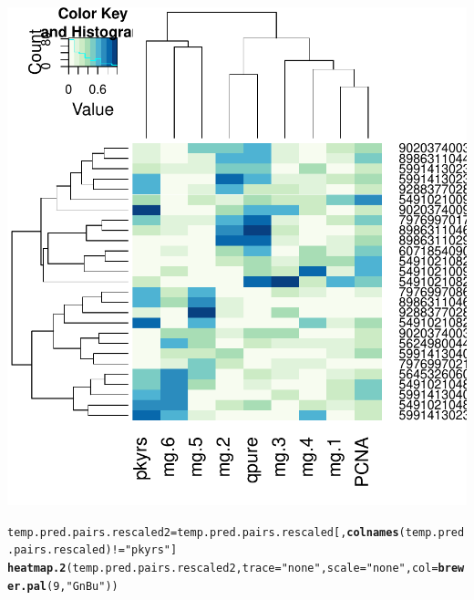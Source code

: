 \documentclass{article}\usepackage[]{graphicx}\usepackage[]{color}
\makeatletter
\def\maxwidth{ %
  \ifdim\Gin@nat@width>\linewidth
    \linewidth
  \else
    \Gin@nat@width
  \fi
}
\newcommand{\hlnum}[1]{\textcolor[rgb]{0.686,0.059,0.569}{#1}}%
\newcommand{\hlstr}[1]{\textcolor[rgb]{0.192,0.494,0.8}{#1}}%
\newcommand{\hlopt}[1]{\textcolor[rgb]{0,0,0}{#1}}%
\newcommand{\hlstd}[1]{\textcolor[rgb]{0.345,0.345,0.345}{#1}}%
\newcommand{\hlkwb}[1]{\textcolor[rgb]{0.69,0.353,0.396}{#1}}%
\newcommand{\hlkwc}[1]{\textcolor[rgb]{0.333,0.667,0.333}{#1}}%
\newcommand{\hlkwd}[1]{\textcolor[rgb]{0.737,0.353,0.396}{\textbf{#1}}}%
\newenvironment{kframe}{%
 \def\at@end@of@kframe{}%
 \ifinner\ifhmode%
  \def\at@end@of@kframe{\end{minipage}}%
  \begin{minipage}{\columnwidth}%
 \fi\fi%
 \def\FrameCommand##1{\hskip\@totalleftmargin \hskip-\fboxsep
 \colorbox{shadecolor}{##1}\hskip-\fboxsep
     \hskip-\linewidth \hskip-\@totalleftmargin \hskip\columnwidth}%
 \MakeFramed {\advance\hsize-\width
   \@totalleftmargin\z@ \linewidth\hsize
   \@setminipage}}%
 {\par\unskip\endMakeFramed%
 \at@end@of@kframe}
\newenvironment{knitrout}{}{} %
\makeatother
\begin{document}
\begin{knitrout}
{\centering \includegraphics[width=\maxwidth]{figure/metagene-pairs-3} 

}


\begin{kframe}\begin{alltt}
\hlstd{temp.pred.pairs.rescaled2} \hlkwb{=} \hlstd{temp.pred.pairs.rescaled[,}\hlkwd{colnames}\hlstd{(temp.pred.pairs.rescaled)} \hlopt{!=} \hlstr{"pkyrs"}\hlstd{]}
\hlkwd{heatmap.2}\hlstd{(temp.pred.pairs.rescaled2,} \hlkwc{trace} \hlstd{=} \hlstr{"none"}\hlstd{,} \hlkwc{scale} \hlstd{=} \hlstr{"none"}\hlstd{,} \hlkwc{col} \hlstd{=} \hlkwd{brewer.pal}\hlstd{(}\hlnum{9}\hlstd{,} \hlstr{"GnBu"}\hlstd{))}
\end{alltt}
\end{kframe}


\end{knitrout}
\end{document}
